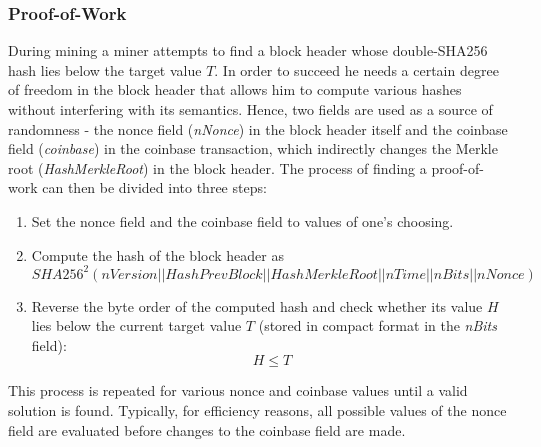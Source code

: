 \subsubsection*{Proof-of-Work}
During mining a miner attempts to find a block header whose double-SHA256 hash lies below the target value $T$. In order to succeed he needs a certain degree of freedom in the block header that allows him to compute various hashes without interfering with its semantics. Hence, two fields are used as a source of randomness - the nonce field (\textit{nNonce}) in the block header itself and the coinbase field (\textit{coinbase}) in the coinbase transaction, which indirectly changes the Merkle root (\textit{HashMerkleRoot}) in the block header. The process of finding a proof-of-work can then be divided into three steps:

\begin{enumerate}[label=\arabic*), leftmargin=1cm]
\item Set the nonce field and the coinbase field to values of one's choosing.
\item Compute the hash of the block header as
\begin{equation}
SHA256^{2}(nVersion||HashPrevBlock||HashMerkleRoot||nTime||nBits||nNonce)
\label{eqn:HashBlock}
\end{equation}
\item Reverse the byte order of the computed hash and check whether its value $\mathit{H}$ lies below the current target value $\mathit{T}$ (stored in compact format in the \textit{nBits} field):
\begin{equation}
H \leq T
\end{equation}

\end{enumerate}

\noindent
This process is repeated for various nonce and coinbase values until a valid solution is found. Typically, for efficiency reasons, all possible values of the nonce field are evaluated before changes to the coinbase field are made.